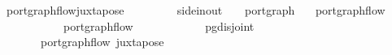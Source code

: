 \ port{\isacharunderscore}graph{\isacharunderscore}flow{\isacharunderscore}juxtapose{\isacharcolon}\isanewline
\ \ \ \ \ \ {\isacharcolon}{\isacharcolon}\isanewline
{}\ {\isacharcolon}{\isacharcolon}\ side{\isacharunderscore}in{\isacharunderscore}out{\isacharcomma}\ \ \ \ port{\isacharunderscore}graph{\isachardoublequoteclose}\isanewline
\ \ \ {\isachardoublequoteopen}port{\isacharunderscore}graph{\isacharunderscore}flow\ \isanewline
\ \ \ \ \ \ \ \ \ \ \ {\isachardoublequoteopen}port{\isacharunderscore}graph{\isacharunderscore}flow\ \isanewline
\ \ \ \ \ \ \ \ \ \ \ {\isachardoublequoteopen}pg{\isacharunderscore}disjoint\ \isanewline
\ \ \ \ \ \ \ {\isachardoublequoteopen}port{\isacharunderscore}graph{\isacharunderscore}flow\ {\isacharparenleft}juxtapose\ 
